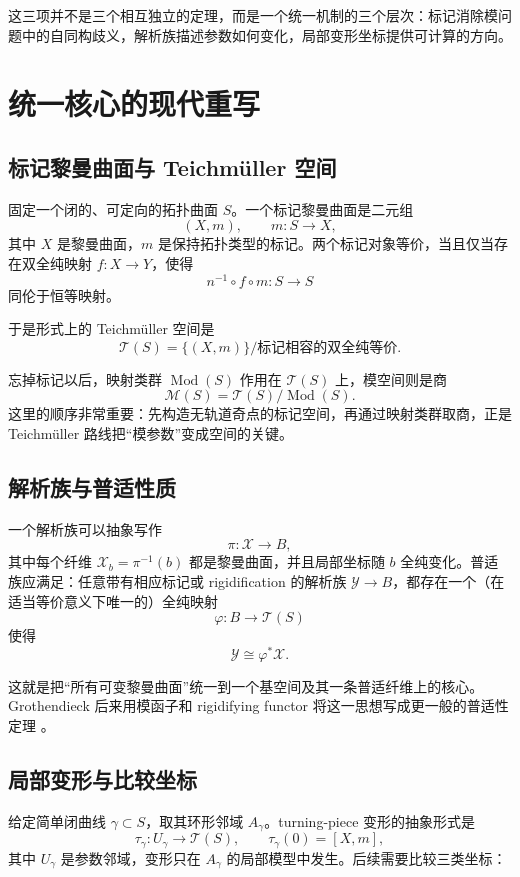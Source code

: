 \documentclass[UTF8,fontset=none,a4paper,11pt]{ctexart}
\begin{document}
这三项并不是三个相互独立的定理，而是一个统一机制的三个层次：标记消除模问题中的自同构歧义，解析族描述参数如何变化，局部变形坐标提供可计算的方向。

\section{统一核心的现代重写}

\subsection{标记黎曼曲面与 Teichmüller 空间}

固定一个闭的、可定向的拓扑曲面 $S$。一个标记黎曼曲面是二元组
\[
  (X,m),\qquad m:S\longrightarrow X,
\]
其中 $X$ 是黎曼曲面，$m$ 是保持拓扑类型的标记。两个标记对象等价，当且仅当存在双全纯映射 $f:X\to Y$，使得
\[
  n^{-1}\circ f\circ m:S\longrightarrow S
\]
同伦于恒等映射。

于是形式上的 Teichmüller 空间是
\[
  \mathcal T(S)
  =\{(X,m)\}/\text{标记相容的双全纯等价}.
\]

忘掉标记以后，映射类群 $\operatorname{Mod}(S)$ 作用在 $\mathcal T(S)$ 上，模空间则是商
\[
  \mathcal M(S)=\mathcal T(S)/\operatorname{Mod}(S).
\]
这里的顺序非常重要：先构造无轨道奇点的标记空间，再通过映射类群取商，正是 Teichmüller 路线把“模参数”变成空间的关键。

\subsection{解析族与普适性质}

一个解析族可以抽象写作
\[
  \pi:\mathcal X\longrightarrow B,
\]
其中每个纤维 $\mathcal X_b=\pi^{-1}(b)$ 都是黎曼曲面，并且局部坐标随 $b$ 全纯变化。普适族应满足：任意带有相应标记或 rigidification 的解析族 $\mathcal Y\to B$，都存在一个（在适当等价意义下唯一的）全纯映射
\[
  \varphi:B\longrightarrow\mathcal T(S)
\]
使得
\[
  \mathcal Y\cong \varphi^*\mathcal X.
\]

这就是把“所有可变黎曼曲面”统一到一个基空间及其一条普适纤维上的核心。Grothendieck 后来用模函子和 rigidifying functor 将这一思想写成更一般的普适性定理 \cite{ACampo2016}。

\subsection{局部变形与比较坐标}

给定简单闭曲线 $\gamma\subset S$，取其环形邻域 $A_\gamma$。turning-piece 变形的抽象形式是
\[
  \tau_\gamma:U_\gamma\longrightarrow \mathcal T(S),
  \qquad \tau_\gamma(0)=[X,m],
\]
其中 $U_\gamma$ 是参数邻域，变形只在 $A_\gamma$ 的局部模型中发生。后续需要比较三类坐标：
\end{document}

